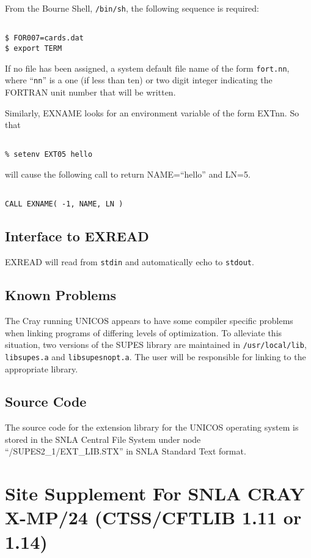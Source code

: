 From the Bourne Shell,
\verb+/bin/sh+,
the following sequence is required:
\begin{verbatim}

$ FOR007=cards.dat
$ export TERM

\end{verbatim}
If no file has been assigned,
a system default file name of the form \verb+fort.nn+, where ``\verb+nn+''
is a one (if less than
ten) or two digit integer indicating the FORTRAN unit number that will be written.

Similarly,
EXNAME looks for an environment variable of the form
EXTnn.
So that
\begin{verbatim}

% setenv EXT05 hello

\end{verbatim}
will cause the following call to return NAME=``hello'' and LN=5.
\begin{verbatim}

CALL EXNAME( -1, NAME, LN )
\end{verbatim}

\subsection{Interface to EXREAD}
EXREAD will read from \verb+stdin+ and automatically echo to \verb+stdout+.

\subsection{Known Problems}
The Cray running UNICOS appears to have some compiler specific problems
when linking programs of differing levels of optimization.
To alleviate this situation,
two versions of the SUPES library are maintained in \verb+/usr/local/lib+,
\verb+libsupes.a+ and
\verb+libsupesnopt.a+.
The user will be responsible for linking to the appropriate library.

\subsection{Source Code}
The source code for the extension library for the UNICOS operating
system is stored in the SNLA Central File System under node
``/SUPES2\_1/EXT\_LIB.STX''
in SNLA Standard Text format.

\cleardoublepage

\section{Site Supplement For SNLA CRAY X-MP/24 (CTSS/CFTLIB 1.11 or 1.14)}

